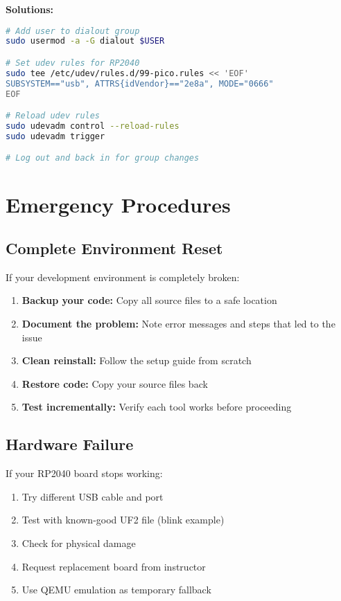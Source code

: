 \documentclass[11pt,a4paper]{article}
\begin{document}
\textbf{Solutions:}
\begin{lstlisting}[language=bash]
# Add user to dialout group
sudo usermod -a -G dialout $USER

# Set udev rules for RP2040
sudo tee /etc/udev/rules.d/99-pico.rules << 'EOF'
SUBSYSTEM=="usb", ATTRS{idVendor}=="2e8a", MODE="0666"
EOF

# Reload udev rules
sudo udevadm control --reload-rules
sudo udevadm trigger

# Log out and back in for group changes
\end{lstlisting}

\section{Emergency Procedures}

\subsection{Complete Environment Reset}

If your development environment is completely broken:

\begin{enumerate}
    \item \textbf{Backup your code:} Copy all source files to a safe location
    \item \textbf{Document the problem:} Note error messages and steps that led to the issue
    \item \textbf{Clean reinstall:} Follow the setup guide from scratch
    \item \textbf{Restore code:} Copy your source files back
    \item \textbf{Test incrementally:} Verify each tool works before proceeding
\end{enumerate}

\subsection{Hardware Failure}

If your RP2040 board stops working:

\begin{enumerate}
    \item Try different USB cable and port
    \item Test with known-good UF2 file (blink example)
    \item Check for physical damage
    \item Request replacement board from instructor
    \item Use QEMU emulation as temporary fallback
\end{enumerate}
\end{document}
